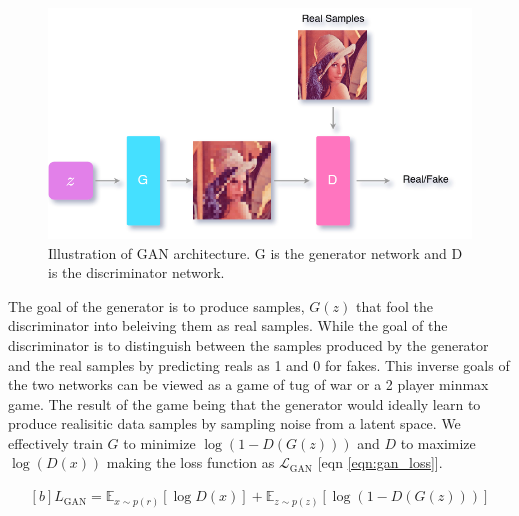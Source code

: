 \begin{figure}[!h]
    \centering
    \includegraphics[scale=0.4]{figures/gan_arch.png}
    \caption{Illustration of GAN architecture. G is the generator network and D is the discriminator network.}
    \label{fig:gan_arch}
\end{figure}

The goal of the generator is to produce samples, $G(z)$ that fool the discriminator into beleiving them as real samples. While the goal of the discriminator is to distinguish between the samples produced by the generator and the real samples by predicting reals as 1 and 0 for fakes. This inverse goals of the two networks can be viewed as a game of tug of war or a 2 player minmax game. The result of the game being that the generator would ideally learn to produce realisitic data samples by sampling noise from a latent space. We effectively train $G$ to minimize $\log(1-D(G({z})))$ and $D$ to maximize $\log(D(x))$ making the loss function as $\mathcal{L}_{\mathrm{GAN}}$ [eqn \ref{eqn:gan_loss}].

\begin{equation} \label{eqn:gan_loss}
    \begin{gathered}[b]
        {L}_{\mathrm{GAN}}=\mathbb{E}_{{x} \sim p({r})}[\log D({x})]+\mathbb{E}_{{z} \sim p({z})}[\log (1-D(G({z})))]
    \end{gathered}
\end{equation}

